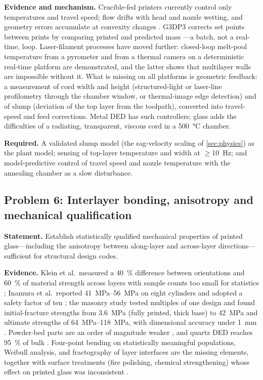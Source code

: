 \textbf{Evidence and mechanism.} Crucible-fed printers currently control only temperatures and travel speed; flow drifts with head and nozzle wetting, and geometry errors accumulate at convexity changes \citep{klein2015,inamura2018}. G3DP3 corrects set points between prints by comparing printed and predicted mass \citep{stern2024cgc}---a batch, not a real-time, loop. Laser-filament processes have moved further: closed-loop melt-pool temperature from a pyrometer \citep{lgd2025tempctrl} and from a thermal camera on a deterministic real-time platform \citep{dgf2026control} are demonstrated, and the latter shows that multilayer walls are impossible without it. What is missing on all platforms is geometric feedback: a measurement of cord width and height (structured-light or laser-line profilometry through the chamber window, or thermal-image edge detection) and of slump (deviation of the top layer from the toolpath), converted into travel-speed and feed corrections. Metal DED has such controllers; glass adds the difficulties of a radiating, transparent, viscous cord in a \SI{500}{\celsius} chamber.

\textbf{Required.} A validated slump model (the sag-velocity scaling of \cref{sec:physics}) as the plant model; sensing of top-layer temperature and width at \(\ge\)\SI{10}{Hz}; and model-predictive control of travel speed and nozzle temperature with the annealing chamber as a slow disturbance.

\subsection{Problem 6: Interlayer bonding, anisotropy and mechanical qualification}
\textbf{Statement.} Establish statistically qualified mechanical properties of printed glass---including the anisotropy between along-layer and across-layer directions---sufficient for structural design codes.

\textbf{Evidence.} Klein et al.\ measured a \SI{40}{\percent} difference between orientations and \SI{60}{\percent} of material strength across layers with sample counts too small for statistics \citep{klein2015}; Inamura et al.\ reported \SIrange{41}{56}{MPa} on eight cylinders and adopted a safety factor of ten \citep{inamura2018}; the masonry study tested multiples of one design and found initial-fracture strengths from \SI{3.6}{MPa} (fully printed, thick base) to \SI{42}{MPa} and ultimate strengths of \SIrange{64}{118}{MPa}, with dimensional accuracy under \SI{1}{mm} \citep{mit2024masonry}. Powder-bed parts are an order of magnitude weaker \citep{datsiou2021}, and quartz DED reaches \SI{95}{\percent} of bulk \citep{lang2024}. Four-point bending on statistically meaningful populations, Weibull analysis, and fractography of layer interfaces are the missing elements, together with surface treatments (fire polishing, chemical strengthening) whose effect on printed glass was inconsistent \citep{inamura2018}.

